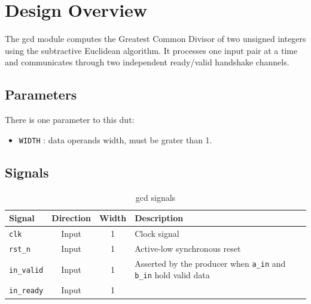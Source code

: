 \chapter{Design Overview} 
\label{cha:design_overview}

The gcd module computes the Greatest Common Divisor of two unsigned integers using the subtractive Euclidean algorithm.
It processes one input pair at a time and communicates through two independent ready/valid handshake channels.

\section{Parameters}

There is one parameter to this dut:

\begin{itemize}
    \item \texttt{WIDTH} : data operands width, must be grater than 1.
\end{itemize}

\section{Signals}

\begin{table}[H]
    \centering
    \begin{tabular}{|l|c|c|l|}
        \hline
        \textbf{Signal}     & \textbf{Direction} & \textbf{Width} & \textbf{Description}            \\ \hline
        \texttt{clk}        & Input              & 1              & Clock signal                    \\ \hline
        \texttt{rst\_n}     & Input              & 1              & Active-low synchronous reset    \\ \hline
        
        \texttt{in_valid}   & Input              & 1              & Asserted by the producer when \texttt{a_in} and \texttt{b_in} hold valid data \\ \hline
        \texttt{in_ready}   & Input              & 1              & 

    \end{tabular}
    \caption{gcd signals}
    \label{tbl:gcd_signals}
\end{table}